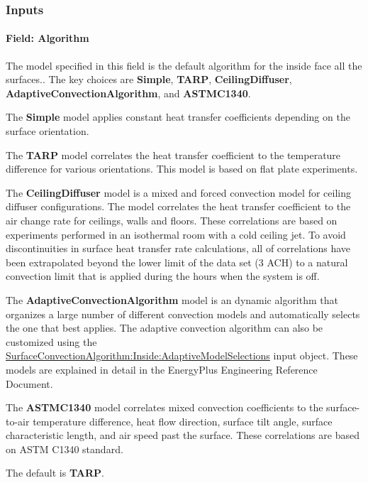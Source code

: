 \subsubsection{Inputs}\label{inputs-4-031}

\paragraph{Field: Algorithm}\label{field-algorithm-000}

The model specified in this field is the default algorithm for the inside face all the surfaces.. The key choices are \textbf{Simple}, \textbf{TARP}, \textbf{CeilingDiffuser}, \textbf{AdaptiveConvectionAlgorithm}, and \textbf{ASTMC1340}.

The \textbf{Simple} model applies constant heat transfer coefficients depending on the surface orientation.

The \textbf{TARP} model correlates the heat transfer coefficient to the temperature difference for various orientations. This model is based on flat plate experiments.

The \textbf{CeilingDiffuser} model is a mixed and forced convection model for ceiling diffuser configurations. The model correlates the heat transfer coefficient to the air change rate for ceilings, walls and floors. These correlations are based on experiments performed in an isothermal room with a cold ceiling jet. To avoid discontinuities in surface heat transfer rate calculations, all of correlations have been extrapolated beyond the lower limit of the data set (3 ACH) to a natural convection limit that is applied during the hours when the system is off.

The \textbf{AdaptiveConvectionAlgorithm} model is an dynamic algorithm that organizes a large number of different convection models and automatically selects the one that best applies. The adaptive convection algorithm can also be customized using the \hyperref[surfaceconvectionalgorithminsideadaptivemodelselections]{SurfaceConvectionAlgorithm:Inside:AdaptiveModelSelections} input object. These models are explained in detail in the EnergyPlus Engineering Reference Document.

The \textbf{ASTMC1340} model correlates mixed convection coefficients to the surface-to-air temperature difference, heat flow direction, surface tilt angle, surface characteristic length, and air speed past the surface. These correlations are based on ASTM C1340 standard.

The default is \textbf{TARP}.

